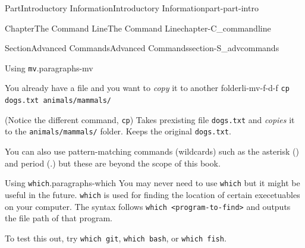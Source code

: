 \documentclass[oneside,10pt,]{book}
\newcommand{\mono}[1]{\texttt{#1}}
\begin{document}
\begin{partptx}{Part}{Introductory Information}{}{Introductory Information}{}{}{part-part-intro}
\begin{chapterptx}{Chapter}{The Command Line}{}{The Command Line}{}{}{chapter-C_commandline}
\begin{sectionptx}{Section}{Advanced Commands}{}{Advanced Commands}{}{}{section-S_advcommands}
\begin{paragraphs}{Using \mono{mv}.}{paragraphs-mv}
\begin{descriptionlist}
\begin{dlinarrow}{You already have a file and you want to \emph{copy} it to another folder}{li-mv-f-d-f}
\mono{cp dogs.txt animals/mammals/}%
\par
(Notice the different command, \mono{cp}) Takes prexisting file \mono{dogs.txt} and \emph{copies} it to the \mono{animals/mammals/} folder. Keeps the original \mono{dogs.txt}.%
\end{dlinarrow}%
\end{descriptionlist}
%
\par
You can also use pattern-matching commands (wildcards) such as the asterisk (\textasteriskcentered{}) and period (.) but these are beyond the scope of this book.%
\end{paragraphs}%
\begin{paragraphs}{Using \mono{which}.}{paragraphs-which}%
%
%
You may never need to use \mono{which} but it might be useful in the future. \mono{which} is used for finding the location of certain execetuables on your computer. The syntax follows \mono{which <program-to-find>} and outputs the file path of that program.%
\par
To test this out, try \mono{which git}, \mono{which bash}, or \mono{which fish}.%
\end{paragraphs}%
\end{sectionptx}
\end{chapterptx}
\end{partptx}
%
%
\typeout{************************************************}
\typeout{************************************************}
%
\end{document}
